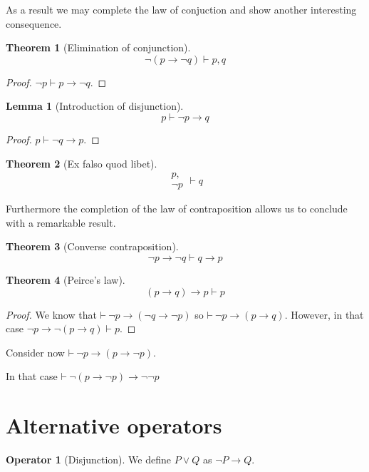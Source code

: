 \documentclass{amsbook}
\newcommand{\infers}{\mathrel\vdash}
\newcommand{\theorem}{\mathord\vdash\medspace}
\newcommand{\then}{\mathrel\rightarrow}
\newcommand{\disj}{\mathrel\vee}
\theoremstyle{definition}
\newtheorem{op}{Operator}[section]
\newtheorem{thm}{Theorem}[section]
\newtheorem{lmm}{Lemma}[section]
\begin{document}
As a result we may complete the law of conjuction and show another interesting consequence.

\begin{thm}[Elimination of conjunction]
    $$\neg(p \then \neg q) \infers p, q$$
    \begin{proof}
        $\neg p \infers p \then \neg q$.
    \end{proof}
\end{thm}

\begin{lmm}[Introduction of disjunction]
    $$p \infers \neg p \then q$$
    \begin{proof}
        $p \infers \neg q \then p$.
    \end{proof}
\end{lmm}

\begin{thm}[Ex falso quod libet]
    $$\begin{aligned}
            p, \\ \neg p
        \end{aligned}\infers q$$
\end{thm}

Furthermore the completion of the law of contraposition allows us to conclude with a remarkable result.

\begin{thm}[Converse contraposition]
    $$\neg p \then \neg q \infers q \then p$$
\end{thm}

\begin{thm}[Peirce's law]
    $$(p \then q) \then p \infers p$$
    \begin{proof}
        We know that $\theorem \neg p \then (\neg q \then \neg p)$ so $\theorem \neg p \then (p \then q)$. However, in that case $\neg p \then \neg(p \then q) \infers p$.
    \end{proof}
\end{thm}

Consider now $\theorem \neg p \then (p \then \neg p)$.

In that case $\theorem \neg(p \then \neg p) \then \neg\neg p$


\section{Alternative operators}


\begin{op}[Disjunction]
    We define $P \disj Q$ as $\neg P \then Q$.
\end{op}
\end{document}
